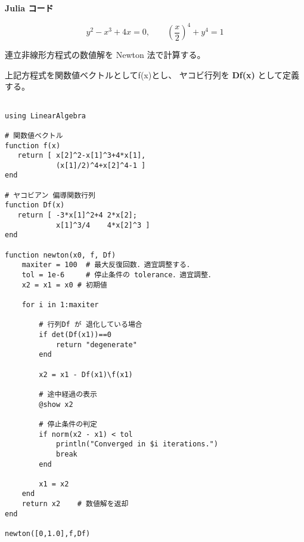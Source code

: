 \documentclass[12pt,b5paper]{ltjsarticle}
\begin{document}
\textbf{Julia コード}

\hrulefill

\begin{equation}
 y^{2} - x^{3} + 4x =0
  ,\qquad
  \left( \frac{x}{2} \right)^{4} + y^{4} =1
\end{equation}

連立非線形方程式の数値解を Newton 法で計算する。

上記方程式を関数値ベクトルとして\textrm{f(x)}とし、
ヤコビ行列を \textbf{Df(x)} として定義する。

\begin{lstlisting}

using LinearAlgebra

# 関数値ベクトル
function f(x)
   return [ x[2]^2-x[1]^3+4*x[1],
            (x[1]/2)^4+x[2]^4-1 ]
end

# ヤコビアン 偏導関数行列
function Df(x)
   return [ -3*x[1]^2+4 2*x[2];
            x[1]^3/4    4*x[2]^3 ]
end

function newton(x0, f, Df)
    maxiter = 100  # 最大反復回数．適宜調整する．
    tol = 1e-6     # 停止条件の tolerance．適宜調整．
    x2 = x1 = x0 # 初期値

    for i in 1:maxiter

        # 行列Df が 退化している場合
        if det(Df(x1))==0
            return "degenerate"
        end

        x2 = x1 - Df(x1)\f(x1)

        # 途中経過の表示
        @show x2

        # 停止条件の判定
        if norm(x2 - x1) < tol
            println("Converged in $i iterations.")
            break
        end

        x1 = x2
    end
    return x2    # 数値解を返却
end

newton([0,1.0],f,Df)

\end{lstlisting}



\hrulefill
\end{document}
